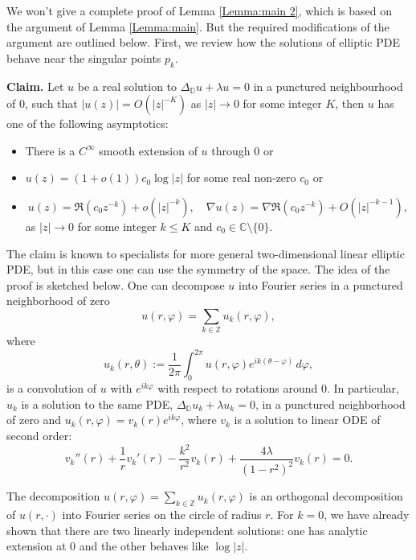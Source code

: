 \documentclass{article}
\begin{document}
We won't give a complete proof of Lemma \ref{Lemma:main 2}, which is based on the argument of Lemma \ref{Lemma:main}. But the required modifications of the argument are outlined below.  First, we review how the solutions of elliptic PDE behave near the singular points $p_k$.

 \textbf{Claim.} Let $u$ be a real solution to $\Delta_{\mathbb D} u +\lambda u=0$ in a punctured neighbourhood of $0$, such that $|u(z)|= O(|z|^{-K})$ as $|z| \to 0$ for some integer $K$, then $u$ has one of the following asymptotics:
\begin{itemize}
    \item There is a $C^\infty$ smooth extension of $u$ through 0 or
    \item $u(z)=(1+o(1))c_0\log|z|$ for some real non-zero $c_0$ or
     \item \begin{equation} \label{eq: Bers pole}
        u(z)=\Re(c_0z^{-k})+o(|z|^{-k}), \quad \nabla u(z)=\nabla\Re( c_0z^{-k})+O(|z|^{-k-1}),
     \end{equation}
as $|z|\to 0$ for some integer $k\leq K$ and $c_0 \in \mathbb{C}\setminus\{0\}$.
\end{itemize}

The claim is known to specialists for more general two-dimensional linear elliptic PDE, but in this case
one can use the symmetry of the space. The idea of the proof is sketched below.
One can decompose $u$ into Fourier series in a punctured neighborhood of zero
$$ u(r,\varphi) = \sum_{k \in \mathbb{Z}}u_k(r,\varphi), $$
where
$$u_k(r,\theta):= \frac{1}{2\pi}\int_0^{2\pi}u(r,\varphi)e^{ik(\theta-\varphi)}\,d\varphi,$$
is a convolution of $u$ with $e^{ik\varphi}$ with respect to rotations around $0$.
In particular, $u_k$ is a solution to the same PDE, $\Delta_{\mathbb D} u_k +\lambda u_k=0$,
in a punctured neighborhood of zero and $u_k(r,\varphi)=v_k(r)e^{ik\varphi}$, where $v_k$ is a solution to linear ODE of second order:
\begin{equation}
v_k''(r) + \frac{1}{r} v_k'(r) - \frac{k^2}{r^2} v_k(r)
    + \frac{4\lambda}{(1-r^2)^2} v_k(r) = 0.
\end{equation}
 
The decomposition $u(r,\varphi) = \sum_{k \in \mathbb{Z}}u_k(r,\varphi)$ is an orthogonal decomposition of $u(r,\cdot)$ into Fourier series on the circle of radius $r$. 
For $k=0$, we have already shown that there are two linearly independent solutions: one has analytic extension at $0$ and the other behaves like $\log|z|$. 
\end{document}
